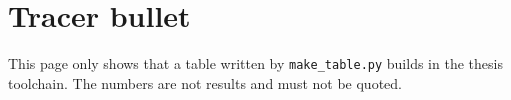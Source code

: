 \documentclass[11pt]{article}
\begin{document}
\section*{Tracer bullet}

This page only shows that a table written by \texttt{make\_table.py} builds in the thesis
toolchain. The numbers are not results and must not be quoted.


\end{document}
